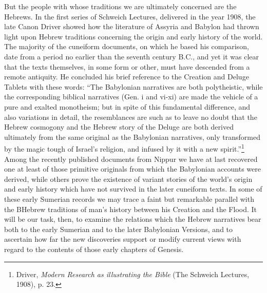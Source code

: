 \documentclass[12pt,oneside]{book}
\begin{document}
But the people with whose traditions we are ultimately concerned are the Hebrews. In the first series of Schweich Lectures, delivered in the year 1908, the late Canon Driver showed how the literature of Assyria and Babylon had thrown light upon Hebrew traditions concerning the origin and early history of the world. The majority of the cuneiform documents, on which he based his comparison, date from a period no earlier than the seventh century B.C., and yet it was clear that the texts themselves, in some form or other, must have descended from a remote antiquity. He concluded his brief reference to the Creation and Deluge Tablets with these words: ``The Babylonian narratives are both polytheistic, while the corresponding biblical narratives (Gen. i and vi-xi) are made the vehicle of a pure and exalted monotheism; but in spite of this fundamental difference, and also variations in detail, the resemblances are such as to leave no doubt that the Hebrew cosmogony and the Hebrew story of the Deluge are both derived ultimately from the same original as the Babylonian narratives, only transformed by the magic tough of Israel's religion, and infused by it with a new spirit.''\footnote{Driver, \textit{Modern Research as illustrating the Bible} (The Schweich Lectures, 1908), p. 23.} Among the recently published documents from Nippur we have at last recovered one at least of those primitive originals from which the Babylonian accounts were derived, while others prove the existence of variant stories of the world's origin and early history which have not survived in the later cuneiform texts. In some of these early Sumerian records we may trace a faint but remarkable parallel with the BHebrew traditions of man's history between his Creation and the Flood. It will be our task, then, to examine the relations which the Hebrew narratives bear both to the early Sumerian and to the later Babylonian Versions, and to ascertain how far the new discoveries support or modify current views with regard to the contents of those early chapters of Genesis. \par 
\end{document}
